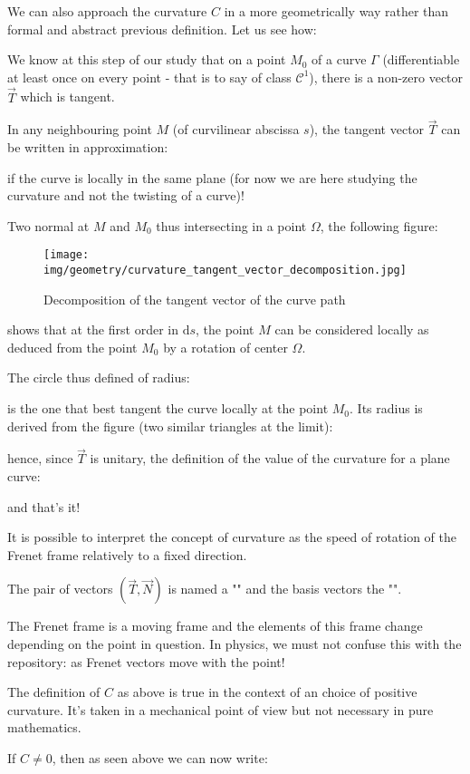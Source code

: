 {	We can also approach the curvature $C$ in a more geometrically way rather than formal and abstract previous definition. Let us see how:
	
	We know at this step of our study that on a point $M_0$ of a curve $\Gamma$ (differentiable at least once on every point - that is to say of class $\mathcal{C}^1$), there is a non-zero vector $\vec{T}$ which is tangent.
	
	In any neighbouring point $M$ (of curvilinear abscissa $s$), the tangent vector $\vec{T}$ can be written in approximation:
	
	if the curve is locally in the same plane (for now we are here studying the curvature and not the twisting of a curve)!
	
	Two normal at $M$ and $M_0$ thus intersecting in a point $\Omega$, the following figure:
	\begin{figure}[H]
		\centering
		\texttt{[image: img/geometry/curvature\_tangent\_vector\_decomposition.jpg]}
		\caption{Decomposition of the tangent vector of the curve path}
	\end{figure}
	shows that at the first order in $\mathrm{d}s$, the point $M$ can be considered locally as deduced from the point $M_0$ by a rotation of center $\Omega$.
	
	The circle thus defined of radius:
	
	is the one that best tangent the curve locally at the point $M_0$. Its radius is derived from the figure (two similar triangles at the limit):
	
	hence, since $\vec{T}$ is unitary, the definition of the value of the curvature for a plane curve:
	
	and that's it!
	
	It is possible to interpret the concept of curvature as the speed of rotation of the Frenet frame relatively to a fixed direction.
	
	The pair of vectors $(\vec{T}, \vec{N})$ is named a "" and the basis vectors the "".
	
	The Frenet frame is a moving frame and the elements of this frame change depending on the point in question. In physics, we must not confuse this with the repository: as Frenet vectors move with the point!
	
	\begin{tcolorbox}[title=Remark,colframe=black,arc=10pt]
	The definition of $C$ as above is true in the context of an choice of positive curvature. It's taken in a mechanical point of view but not necessary in pure mathematics.
	\end{tcolorbox}	
	If $C\neq 0$, then as seen above we can now write:
	
}
